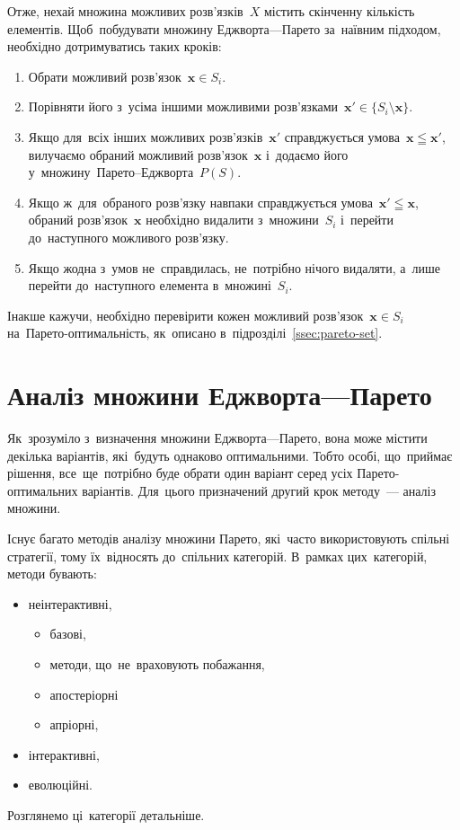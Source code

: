 \documentclass[
  a4paper,
  oneside,
  BCOR = 10mm,
  DIV = 12,
  12pt,
  headings = normal,
]{scrartcl}
\newcommand{\vect}[1]{\mathbf{#1}}
\begin{document}
      Отже, нехай множина можливих розв'язків~$X$ містить скінченну кількість елементів. Щоб~побудувати множину Еджворта—Парето за~наївним підходом, необхідно дотримуватись таких кроків:
      \begin{enumerate}
        \item Обрати можливий розв'язок~$\vect{x} \in S_i$.
        \item Порівняти його з~усіма іншими можливими розв'язками~$\vect{x'} \in \{ S_i \setminus \vect{x} \}$.
        \item Якщо для~всіх інших можливих розв'язків~$\vect{x'}$ справджується умова~$\vect{x} \leqq \vect{x'}$, вилучаємо обраний можливий розв'язок~$\vect{x}$ і~додаємо його у~множину~Парето–Еджворта~$P(S)$.
        \item Якщо ж~для~обраного розв'язку навпаки справджується умова~$\vect{x'} \leqq \vect{x}$, обраний розв'язок~$\vect{x}$ необхідно видалити з~множини~$S_i$ і~перейти до~наступного можливого розв'язку.
        \item Якщо жодна з~умов не~справдилась, не~потрібно нічого видаляти, а~лише перейти до~наступного елемента в~множині~$S_i$.
      \end{enumerate}
      Інакше кажучи, необхідно перевірити кожен можливий розв'язок~$\vect{x} \in S_i$ на~Парето-оптимальність, як~описано в~підрозділі~\ref{ssec:pareto-set}.

    \section{Аналіз множини Еджворта—Парето}

      Як~зрозуміло з~визначення множини Еджворта—Парето, вона може містити декілька варіантів, які~будуть однаково оптимальними. Тобто особі, що~приймає рішення, все~ще~потрібно буде обрати один варіант серед усіх Парето-оптимальних варіантів. Для~цього призначений другий крок методу~— аналіз множини.

      Існує багато методів аналізу множини Парето, які~часто використовують спільні стратегії, тому їх~відносять до~спільних категорій. В~рамках цих~категорій, методи бувають:
      \begin{itemize}
        \item неінтерактивні,
          \begin{itemize}
            \item базові,
            \item методи, що~не~враховують побажання,
            \item апостеріорні
            \item апріорні,
          \end{itemize}
        \item інтерактивні,
        \item еволюційні.
      \end{itemize}
      Розглянемо ці~категорії детальніше.
\end{document}
